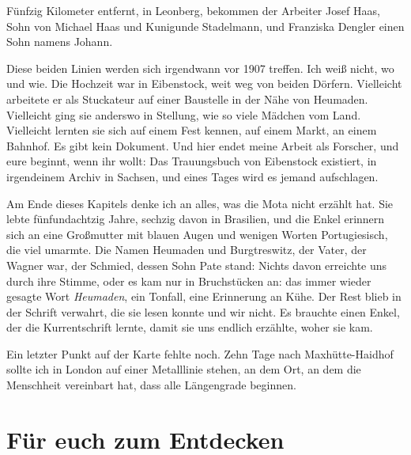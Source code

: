 \documentclass[
  ngerman,
  11pt,
  openany]{book}
\begin{document}
Fünfzig Kilometer entfernt, in Leonberg, bekommen der Arbeiter Josef
Haas, Sohn von Michael Haas und Kunigunde Stadelmann, und Franziska
Dengler einen Sohn namens Johann.

Diese beiden Linien werden sich irgendwann vor 1907 treffen. Ich weiß
nicht, wo und wie. Die Hochzeit war in Eibenstock, weit weg von beiden
Dörfern. Vielleicht arbeitete er als Stuckateur auf einer Baustelle in
der Nähe von Heumaden. Vielleicht ging sie anderswo in Stellung, wie so
viele Mädchen vom Land. Vielleicht lernten sie sich auf einem Fest
kennen, auf einem Markt, an einem Bahnhof. Es gibt kein Dokument. Und
hier endet meine Arbeit als Forscher, und eure beginnt, wenn ihr wollt:
Das Trauungsbuch von Eibenstock existiert, in irgendeinem Archiv in
Sachsen, und eines Tages wird es jemand aufschlagen.

Am Ende dieses Kapitels denke ich an alles, was die Mota nicht erzählt
hat. Sie lebte fünfundachtzig Jahre, sechzig davon in Brasilien, und die
Enkel erinnern sich an eine Großmutter mit blauen Augen und wenigen
Worten Portugiesisch, die viel umarmte. Die Namen Heumaden und
Burgtreswitz, der Vater, der Wagner war, der Schmied, dessen Sohn Pate
stand: Nichts davon erreichte uns durch ihre Stimme, oder es kam nur in
Bruchstücken an: das immer wieder gesagte Wort \emph{Heumaden}, ein
Tonfall, eine Erinnerung an Kühe. Der Rest blieb in der Schrift
verwahrt, die sie lesen konnte und wir nicht. Es brauchte einen Enkel,
der die Kurrentschrift lernte, damit sie uns endlich erzählte, woher sie
kam.

Ein letzter Punkt auf der Karte fehlte noch. Zehn Tage nach
Maxhütte-Haidhof sollte ich in London auf einer Metalllinie stehen, an
dem Ort, an dem die Menschheit vereinbart hat, dass alle Längengrade
beginnen.

\section{Für euch zum Entdecken}\label{fuxfcr-euch-zum-entdecken-17}
\end{document}
